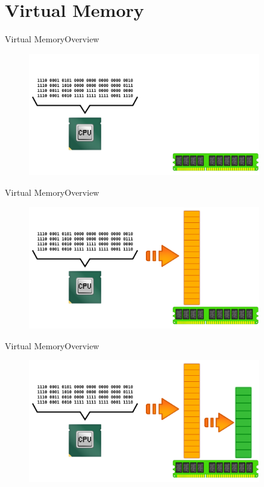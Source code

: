 \documentclass[10pt]{beamer}
\begin{document}
\section{Virtual Memory}
\begin{frame}{Virtual Memory}{Overview}
  \begin{figure}[ht]
    \centering
    \includegraphics[width=0.9\textwidth, keepaspectratio=true]{images/virtual_memory_a.png}
  \end{figure}
\end{frame}

\begin{frame}{Virtual Memory}{Overview}
  \begin{figure}[ht]
    \centering
    \includegraphics[width=0.9\textwidth, keepaspectratio=true]{images/virtual_memory_b.png}
  \end{figure}
\end{frame}

\begin{frame}{Virtual Memory}{Overview}
  \begin{figure}[ht]
    \centering
    \includegraphics[width=0.9\textwidth, keepaspectratio=true]{images/virtual_memory_c.png}
  \end{figure}
\end{frame}
\end{document}
